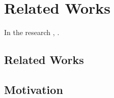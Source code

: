 \chapter{Related Works} %
\label{Chapter2}
In the research \cite{balogh}, \cite{ttt}.
\section {Related Works}
\section {Motivation}
